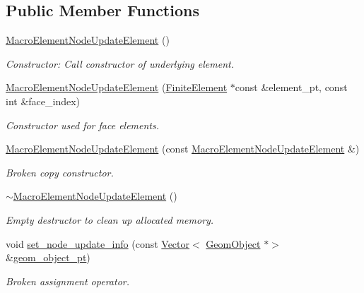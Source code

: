 \subsection*{Public Member Functions}
\begin{DoxyCompactItemize}
\item 
\hyperlink{classoomph_1_1MacroElementNodeUpdateElement_ab49b2589181fe58687ae0d628d02ed4c}{Macro\+Element\+Node\+Update\+Element} ()
\begin{DoxyCompactList}\small\item\em Constructor\+: Call constructor of underlying element. \end{DoxyCompactList}\item 
\hyperlink{classoomph_1_1MacroElementNodeUpdateElement_a9c5e49933712f3dd500068b021f8dfdc}{Macro\+Element\+Node\+Update\+Element} (\hyperlink{classoomph_1_1FiniteElement}{Finite\+Element} $\ast$const \&element\+\_\+pt, const int \&face\+\_\+index)
\begin{DoxyCompactList}\small\item\em Constructor used for face elements. \end{DoxyCompactList}\item 
\hyperlink{classoomph_1_1MacroElementNodeUpdateElement_a52d1a2a2ae623a1a459c217d82f3cedd}{Macro\+Element\+Node\+Update\+Element} (const \hyperlink{classoomph_1_1MacroElementNodeUpdateElement}{Macro\+Element\+Node\+Update\+Element} \&)
\begin{DoxyCompactList}\small\item\em Broken copy constructor. \end{DoxyCompactList}\item 
\hyperlink{classoomph_1_1MacroElementNodeUpdateElement_a0010eb32e2ef063ef8911c63a66ab515}{$\sim$\+Macro\+Element\+Node\+Update\+Element} ()
\begin{DoxyCompactList}\small\item\em Empty destructor to clean up allocated memory. \end{DoxyCompactList}\item 
void \hyperlink{classoomph_1_1MacroElementNodeUpdateElement_a229ef724fbfd1917159508bde5207fb5}{set\+\_\+node\+\_\+update\+\_\+info} (const \hyperlink{classoomph_1_1Vector}{Vector}$<$ \hyperlink{classoomph_1_1GeomObject}{Geom\+Object} $\ast$$>$ \&\hyperlink{classoomph_1_1MacroElementNodeUpdateElementBase_a45d0d15ee371799c84f59bb13cdac304}{geom\+\_\+object\+\_\+pt})
\begin{DoxyCompactList}\small\item\em Broken assignment operator. \end{DoxyCompactList}\item 
$$
\end{DoxyCompactItemize}

